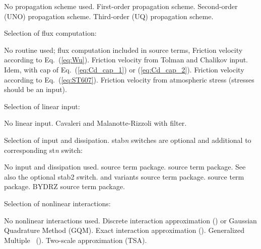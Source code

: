 \begin{slist}
 {No propagation scheme used.}
 {First-order propagation scheme.}
 {Second-order (UNO) propagation scheme.}
 {Third-order (UQ) propagation scheme.}
\end{slist}

\noindent
Selection of flux computation:
\begin{slist}
 {No routine used; flux computation included in source terms,}
 {Friction velocity according to Eq.~(\ref{eq:Wu}).}
 {Friction velocity from Tolman and Chalikov input.}
 {Idem, with cap of Eq.~(\ref{eq:Cd_cap_1}) or (\ref{eq:Cd_cap_2}).}
 {Friction velocity according to Eq.~(\ref{eq:ST607}).}
 {Friction velocity from atmospheric stress (stresses should be an input).}
\end{slist}

\noindent
Selection of linear input:
\begin{slist}
 {No linear input.}
 {Cavaleri and Malanotte-Rizzoli with filter.}
\end{slist}

\noindent
Selection of input and dissipation. {\F stab{}\it n} switches are optional and
additional to corresponding {\F st{\it n}} switch:
\begin{slist}
 {No input and dissipation used.}
 {\wam{} source term package.}
 {\cite{tol:JPO96} source term package. See also the optional 
          {\F stab2} switch.}
 {\wam{} and variants source term package.}
 {\cite{art:Aea10} source term package.}
 {BYDRZ source term package.}
\end{slist}

\noindent
Selection of nonlinear interactions:
\begin{slist}
 {No nonlinear interactions used.}
 {Discrete interaction approximation (\dia) or Gaussian Quadrature Method (GQM).}
 {Exact interaction approximation (\xnl).}
 {Generalized Multiple \dia\ (\gmd).}
 {Two-scale approximation (TSA).} 
\end{slist}

